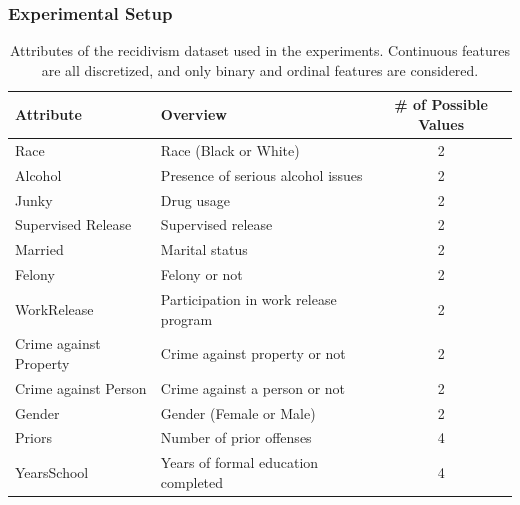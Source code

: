 \documentclass[11pt]{article}
\begin{document}
\subsubsection{Experimental Setup}\label{sec:exp_setting}
{%
  \renewcommand{\arraystretch}{1.05}
  \begin{table}[tbp]
    \centering
    \caption[Attributes of the recidivism dataset used in the experiments]{%
      Attributes of the recidivism dataset used in the experiments.
      Continuous features are all discretized,
      and only binary and ordinal features are considered.
    }\label{tab:rcdv}
    \ifnum{}
      \small
    \fi
    \begin{tabular}{llc}
      \toprule
      Attribute              & Overview                              & \# of \ifnum\mode=1 Possible \fi Values \\
      \midrule
      Race                   & Race (Black or White)                 & 2                                       \\
      Alcohol                & Presence of serious alcohol issues    & 2                                       \\
      Junky                  & Drug usage                            & 2                                       \\
      Supervised Release     & Supervised release                    & 2                                       \\
      Married                & Marital status                        & 2                                       \\
      Felony                 & Felony or not                         & 2                                       \\
      WorkRelease            & Participation in work release program & 2                                       \\
      Crime against Property & Crime against property or not         & 2                                       \\
      Crime against Person   & Crime against a person or not         & 2                                       \\
      Gender                 & Gender (Female or Male)               & 2                                       \\
      Priors                 & Number of prior offenses              & 4                                       \\
      YearsSchool            & Years of formal education completed   & 4                                       \\

\end{tabular}
\end{table}}
\end{document}
